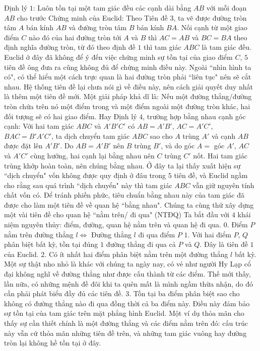 \begin{multicols}{2}
	\vskip 0.1cm
	Định lý $1$: Luôn tồn tại một tam giác đều các cạnh dài bằng $AB$ với mỗi đoạn $AB$ cho trước 
	\vskip 0.1cm
	Chứng minh của Euclid: Theo Tiên đề $3$, ta vẽ được đường tròn tâm $A$ bán kính $AB$ và đường tròn tâm $B$ bán kính $BA$. Nối cạnh từ một giao điểm $C$ nào đó của hai đường tròn tới $A$ và $B$ thì $AC = AB$ và $BC = BA$ theo định nghĩa đường tròn, từ đó theo định đề $1$ thì tam giác $ABC$ là tam giác đều.
	\vskip 0.1cm
	Euclid ở đây đã không để ý đến việc chứng minh sự tồn tại của giao điểm $C$, $5$ tiên đề ông đưa ra cũng không đủ để chứng minh điều này. Ngoài ``nhìn hình ta có", có thể hiểu một cách trực quan là hai đường tròn phải ``liên tục" nên sẽ cắt nhau. Hệ thống tiên đề lại chưa nói gì về điều này, nên cách giải quyết duy nhất là thêm một tiên đề mới. Một giải pháp khả dĩ là:
	\vskip 0.1cm
	Nếu một đường thẳng/đường tròn chứa trên nó một điểm trong và một điểm ngoài một đường tròn khác, hai đối tượng sẽ có hai giao điểm.
	\vskip 0.1cm
	Hay Định lý $4$, trường hợp bằng nhau cạnh góc cạnh: Với hai tam giác $ABC$ và $A'B'C'$ có $AB = A'B'$, $AC = A'C'$, $BAC = B'A'C'$, ta dịch chuyển tam giác $ABC$ sao cho $A$ trùng $A'$ và cạnh $AB$ được đặt lên $A'B'$. Do $AB = A'B'$ nên $B$ trùng $B'$, và do góc $A =$ góc $A'$, $AC$ và $A'C'$ cùng hướng, hai cạnh lại bằng nhau nên $C$ trùng $C'$ nốt. Hai tam giác trùng khớp hoàn toàn, nên chúng bằng nhau.
	\vskip 0.1cm
	Ở đây ta lại thấy xuất hiện sự ``dịch chuyển" vốn không được quy định ở đâu trong $5$ tiên đề, và Euclid ngầm cho rằng sau quá trình ``dịch chuyển" này thì tam giác $ABC$ vẫn giữ nguyên tính chất vốn có. Để tránh phiền phức, tiêu chuẩn bằng nhau này của tam giác đã được cho làm một tiên đề về quan hệ ``bằng nhau".
	\vskip 0.1cm
	Chúng ta cùng thử xây dựng một vài tiên đề cho quan hệ ``nằm trên/ đi qua" (NTĐQ)
	\vskip 0.1cm
	Ta bắt đầu với $4$ khái niệm nguyên thủy: điểm, đường, quan hệ nằm trên và quan hệ đi qua.
	\vskip 0.1cm
	$0.$ Điểm $P$ nằm trên đường thẳng $l \Leftrightarrow$ Đường thẳng $l$ đi qua điểm $P$
	\vskip 0.1cm
	$1.$ Với hai điểm $P$, $Q$ phân biệt bất kỳ, tồn tại đúng $1$ đường thẳng đi qua cả $P$ và $Q$. Đây là tiên đề $1$ của Euclid.
	\vskip 0.1cm
	$2.$ Có ít nhất hai điểm phân biệt nằm trên một đường thẳng $l$ bất kỳ. Một sự thật nho nhỏ là khác với chúng ta ngày nay, có vẻ như người Hy Lạp cổ đại không nghĩ về đường thẳng như được cấu thành từ các điểm. Thế mới thấy, lần nữa, có những mệnh đề đôi khi ta quên mất là mình ngầm thừa nhận, do đó cần phải phát biểu đầy đủ các tiên đề.
	\vskip 0.1cm
	$3.$ Tồn tại ba điểm phân biệt sao cho không có đường thẳng nào đi qua đồng thời cả ba điểm này. Điều này đảm bảo sự tồn tại của tam giác trên mặt phẳng hình Euclid. Một ví dụ thỏa mãn cho thấy sự cần thiết chính là một đường thẳng và các điểm nằm trên đó: cấu trúc này vẫn cứ thỏa mãn những tiên đề trên, và những tam giác vuông hay đường tròn lại không hề tồn tại ở đây.

\end{multicols}
